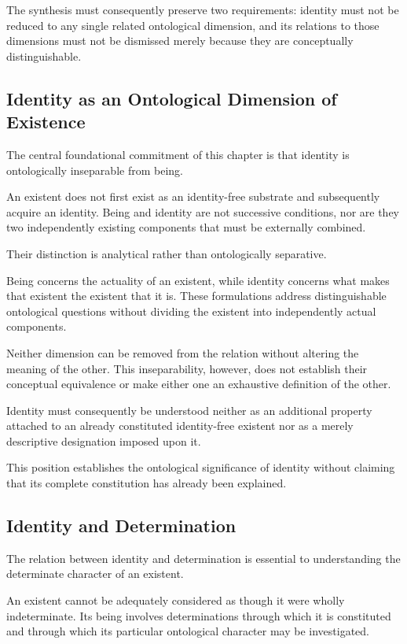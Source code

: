 The synthesis must consequently preserve two requirements:
identity must not be reduced to any single related
ontological dimension, and its relations to those
dimensions must not be dismissed merely because they
are conceptually distinguishable.

\subsection{Identity as an Ontological Dimension of Existence}

The central foundational commitment of this chapter is
that identity is ontologically inseparable from being.

An existent does not first exist as an identity-free
substrate and subsequently acquire an identity. Being
and identity are not successive conditions, nor are they
two independently existing components that must be
externally combined.

Their distinction is analytical rather than ontologically
separative.

Being concerns the actuality of an existent, while
identity concerns what makes that existent the existent
that it is. These formulations address distinguishable
ontological questions without dividing the existent
into independently actual components.

Neither dimension can be removed from the relation
without altering the meaning of the other. This
inseparability, however, does not establish their
conceptual equivalence or make either one an exhaustive
definition of the other.

Identity must consequently be understood neither as
an additional property attached to an already constituted
identity-free existent nor as a merely descriptive
designation imposed upon it.

This position establishes the ontological significance
of identity without claiming that its complete
constitution has already been explained.

\subsection{Identity and Determination}

The relation between identity and determination is
essential to understanding the determinate character
of an existent.

An existent cannot be adequately considered as though
it were wholly indeterminate. Its being involves
determinations through which it is constituted and
through which its particular ontological character
may be investigated.

